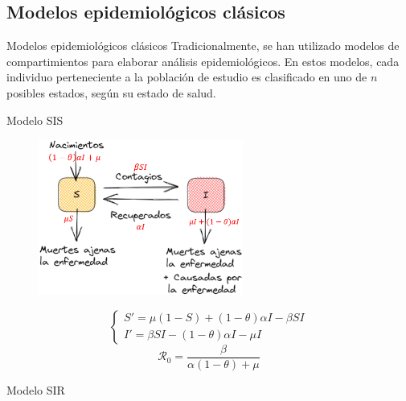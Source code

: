 \documentclass[9pt]{beamer}
\begin{document}
\subsection{Modelos epidemiológicos clásicos}
\begin{frame}{Modelos epidemiológicos clásicos}
Tradicionalmente, se han utilizado modelos de compartimientos para elaborar análisis epidemiológicos. En estos modelos, cada individuo perteneciente a la población de estudio es clasificado en uno de $n$ posibles estados, según su estado de salud. \cite{modelCompartimental}

\begin{minipage}{0.47\textwidth}
    \begin{block}{Modelo SIS}
        \begin{figure}[h]
            \centering
            \includegraphics[width=0.6\textwidth]{Imagenes/SIS_compartimientos.PNG}
            \label{fig:diagrama SIS}
        \end{figure}
        \begin{equation*}\label{eq:Modelo SIS}
            \left\{\begin{array}{l}
                S' = \mu(1 - S) + (1 - \theta)\alpha I - \beta S I \\
                I' = \beta S I - (1 - \theta)\alpha I - \mu I
            \end{array}\right.
        \end{equation*}
        \begin{equation*}
            \mathcal{R}_0 = \frac{\beta}{\alpha(1-\theta)+\mu}
        \end{equation*}
    \end{block}
\end{minipage}
\hfill
\begin{minipage}{0.47\textwidth}
\begin{block}{Modelo SIR}
    \begin{figure}[h]

\end{figure}
\end{block}
\end{minipage}
\end{frame}
\end{document}
